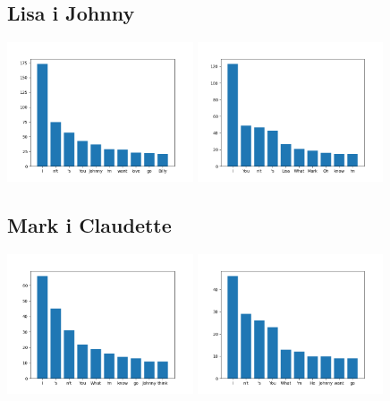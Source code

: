 \documentclass[a4paper,12pt]{article}
\begin{document}
	\subsection{Lisa i Johnny}
	\begin{center}
		{\includegraphics[width=5.5cm]{lisasMostCommonWords.png}}
		{\includegraphics[width=5.5cm]{johnnysMostCommonWords.png}}\\
	\end{center}
	\subsection{Mark i Claudette}
	\begin{center}
		{\includegraphics[width=5.5cm]{marksMostCommonWords.png}}
		{\includegraphics[width=5.5cm]{claudettesMostCommonWords.png}}\\	
	\end{center}
\end{document}
